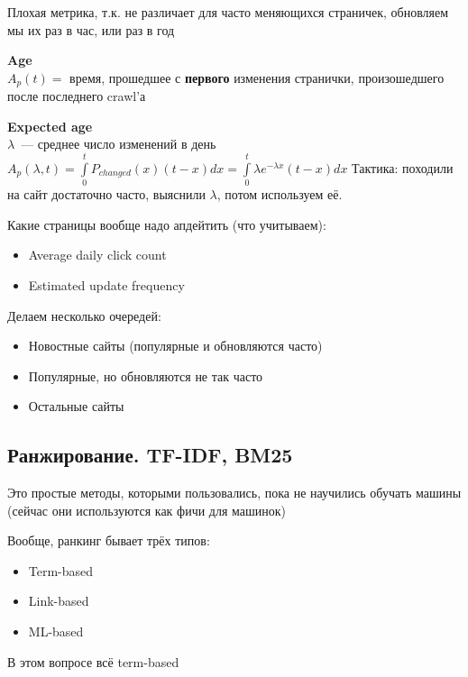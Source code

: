 \documentclass[12pt]{article}
\begin{document}
    Плохая метрика, т.к. не различает для часто меняющихся страничек, обновляем мы их раз в час, или раз в год
    
    \smallskip\smallskip
    {\bf Age}\\
    $A_p(t) = $ время, прошедшее с {\bf первого} изменения странички, произошедшего после последнего crawl'а

    \smallskip\smallskip
    {\bf Expected age}\\
    $\lambda$~--- среднее число изменений в день\\
    $A_p(\lambda, t) = \int\limits_0^t P_{changed}(x)(t - x)dx = \int\limits_0^t \lambda e^{- \lambda x} (t - x) dx$
    Тактика: походили на сайт достаточно часто, выяснили $\lambda$, потом используем её.

    \smallskip \smallskip
    Какие страницы вообще надо апдейтить (что учитываем):
      \begin{itemize}
        \item Average daily click count
        \item Estimated update frequency
      \end{itemize}

    \smallskip \smallskip
    Делаем несколько очередей:
      \begin{itemize}
          \item Новостные сайты (популярные и обновляются часто)
          \item Популярные, но обновляются не так часто
          \item Остальные сайты
      \end{itemize}
    \pagebreak
  \subsection{Ранжирование. TF-IDF, BM25}
    Это простые методы, которыми пользовались, пока не научились обучать машины (сейчас они используются как фичи для машинок)

    \smallskip\smallskip
    Вообще, ранкинг бывает трёх типов:
      \begin{itemize}
        \item Term-based
        \item Link-based
        \item ML-based
      \end{itemize} 
    В этом вопросе всё term-based
\end{document}
